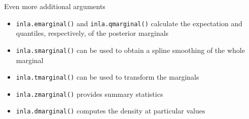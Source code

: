 \documentclass[9pt,ignorenonframetext,]{beamer}
\begin{document}
\begin{frame}[fragile]{Even more additional arguments}
\protect\hypertarget{even-more-additional-arguments}{}

\begin{itemize}
\item
  \texttt{inla.emarginal()} and \texttt{inla.qmarginal()} calculate the
  expectation and quantiles, respectively, of the posterior marginals
  \vspace{0.25cm}
\item
  \texttt{inla.smarginal()} can be used to obtain a spline smoothing of
  the whole marginal \vspace{0.25cm}
\item
  \texttt{inla.tmarginal()} can be used to transform the marginals
  \vspace{0.25cm}
\item
  \texttt{inla.zmarginal()} provides summary statistics \vspace{0.25cm}
\item
  \texttt{inla.dmarginal()} computes the density at particular values
\end{itemize}

\end{frame}
\end{document}
